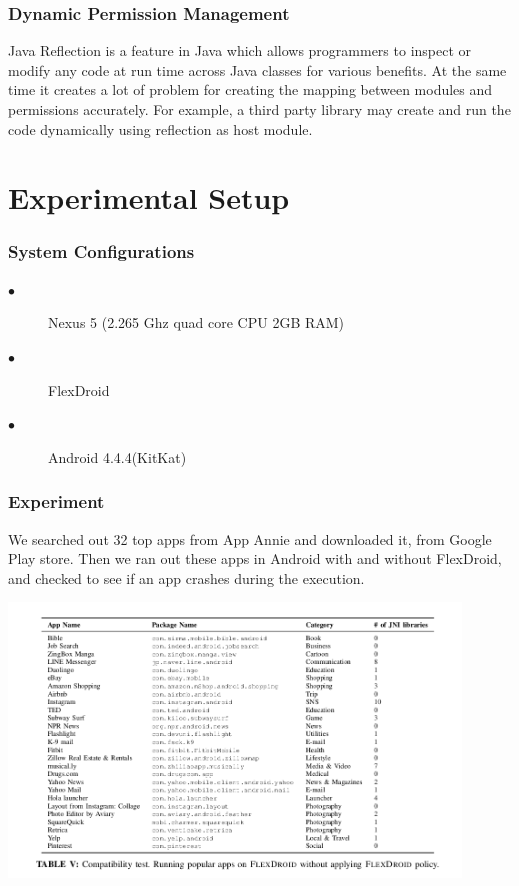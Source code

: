 \documentclass[11pt]{report}
\begin{document}
\subsection{Dynamic Permission Management}
\par Java Reflection is a feature in Java which allows programmers to inspect or modify any code at run time across Java classes for various benefits. At the same time it creates 
a lot of problem for creating the mapping between modules and permissions accurately. For example, a third party library may create and run the code dynamically using reflection as
host module.
\par
\chapter{Experimental Setup}
\subsection{System Configurations}
\begin{description}
 \item[$\bullet$]Nexus 5 (2.265 Ghz quad core CPU 2GB RAM)  
 \item[$\bullet$]FlexDroid
 \item[$\bullet$]Android 4.4.4(KitKat)
\end{description}
\subsection{Experiment}
\par We searched out 32 top apps from App Annie and downloaded it, from Google Play store.
Then we ran out these apps in Android with and without FlexDroid, and checked to see if an app crashes during the execution.

\includegraphics[width=120mm]{./images/table-5.png}\newline
\end{document}

